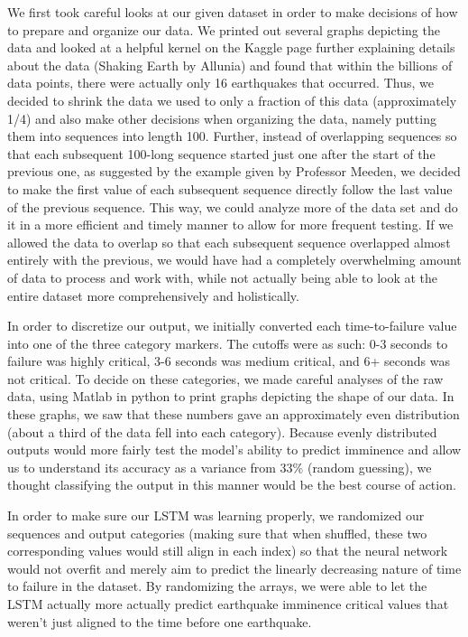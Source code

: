 \documentclass[11pt]{article}
\begin{document}
We first took careful looks at our given dataset in order to make decisions of how to prepare and organize our data. We printed out several graphs depicting
the data and looked at a helpful kernel on the Kaggle page further explaining details about the data (Shaking Earth by Allunia) and found that
within the billions of data points, there were actually only 16 earthquakes that occurred. Thus, we decided to shrink the data we used to only a fraction of this data (approximately 1/4)
and also make other decisions when organizing the data, namely putting them into sequences into length 100. Further, instead of overlapping sequences
so that each subsequent 100-long sequence started just one after the start of the previous one, as suggested by the example given by Professor Meeden, we decided to make the first value of each subsequent sequence directly follow the last value of the previous sequence. This way, we could analyze more of the data set and do
it in a more efficient and timely manner to allow for more frequent testing. If we allowed the data to overlap so that each subsequent sequence overlapped almost entirely with the previous, we would have had a completely overwhelming amount of data to process and work with, while not actually being able to look at the entire dataset more comprehensively and holistically.

In order to discretize our output, we initially converted each time-to-failure value into one of the three category markers. The cutoffs were as such:
0-3 seconds to failure was highly critical, 3-6 seconds was medium critical, and 6+ seconds was not critical. To decide on these categories, we
made careful analyses of the raw data, using Matlab in python to print graphs depicting the shape of our data. In these graphs, we saw that
these numbers gave an approximately even distribution (about a third of the data fell into each category). Because 
evenly distributed outputs would more fairly test the model's ability to predict imminence and allow us to understand its accuracy as a variance from 33\% (random guessing), we thought classifying the output in this manner would be the best course of action.

In order to make sure our LSTM was learning properly, we randomized our sequences and output categories (making sure that when shuffled, these two corresponding values would still align in each index) so that the neural network would not overfit and merely aim to predict the linearly decreasing nature of time to failure in the dataset. By randomizing the arrays, we were able to let the LSTM actually more actually predict earthquake imminence critical values that weren't just aligned to the time before one earthquake.
\end{document}
